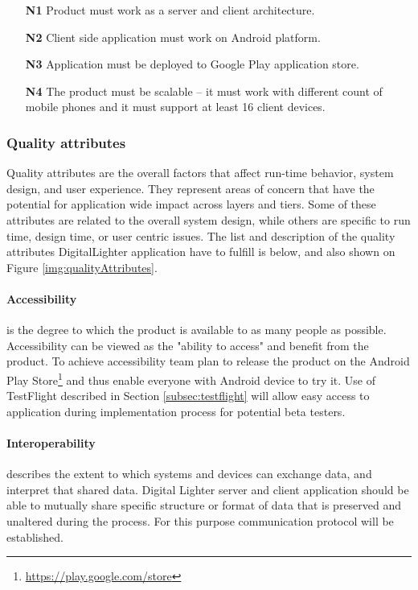 \begin{enumerate}
\item[\textbf{N1}] \label{req_N1} Product must work as a server and client architecture.
\item[\textbf{N2}] \label{req_N2} Client side application must work on Android platform.
\item[\textbf{N3}] \label{req_N3} Application must be deployed to Google Play application store.
\item[\textbf{N4}] \label{req_N4} The product must be scalable -- it must work with  different count of mobile phones and it must support at least 16 client devices.
\end{enumerate}

\subsubsection{Quality attributes}
\label{sec:quality_attributes}
Quality attributes are the overall factors that affect run-time behavior, system design, and user experience. They represent areas of concern that have the potential for application wide impact across layers and tiers. Some of these attributes are related to the overall system design, while others are specific to run time, design time, or user centric issues. The list and description of the quality attributes DigitalLighter application have to fulfill is below, and also shown on Figure \ref{img:qualityAttributes}.

\paragraph{Accessibility}
is the degree to which the product is available to as many people as possible. 
Accessibility can be viewed as the "ability to access" and benefit from the product. 
To achieve accessibility team plan to release the product on the Android Play Store\footnote{\url{https://play.google.com/store}} and thus enable everyone with Android device to try it. Use of TestFlight described in Section \ref{subsec:testflight} will allow easy access to application during implementation process for potential beta testers.

\paragraph{Interoperability}
describes the extent to which systems and devices can exchange data, and interpret that shared data. Digital Lighter server and client application should be able to mutually share specific structure or format of data that is preserved and unaltered during the process. For this purpose communication protocol will be established.

